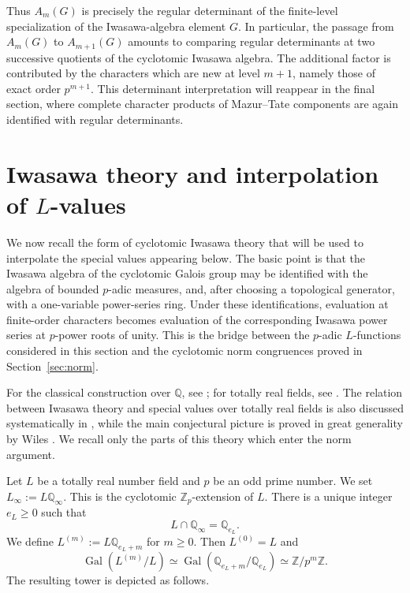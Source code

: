 \documentclass[11pt,table]{amsart}
\numberwithin{equation}{section}
\begin{document}
Thus \(A_m(G)\) is precisely the regular determinant of the finite-level
specialization of the Iwasawa-algebra element \(G\).  In particular, the
passage from \(A_m(G)\) to \(A_{m+1}(G)\) amounts to comparing regular
determinants at two successive quotients of the cyclotomic Iwasawa
algebra.  The additional factor is contributed by the characters which
are new at level \(m+1\), namely those of exact order \(p^{m+1}\).
This determinant interpretation will reappear in the final section, where complete character products of Mazur--Tate components are again identified with regular determinants.
\section{Iwasawa theory and interpolation of $L$-values}\label{s 3}

\par We now recall the form of cyclotomic Iwasawa theory that will be used to
interpolate the special values appearing below.  The basic point is that
the Iwasawa algebra of the cyclotomic Galois group may be identified with
the algebra of bounded $p$-adic measures, and, after choosing a
topological generator, with a one-variable power-series ring.  Under these
identifications, evaluation at finite-order characters becomes evaluation
of the corresponding Iwasawa power series at $p$-power roots of unity.
This is the bridge between the $p$-adic $L$-functions considered in this
section and the cyclotomic norm congruences proved in
Section~\ref{sec:norm}.
\par For the classical construction over $\mathbb Q$, see \cite{KubotaLeopoldt,Iwasawa1972,Washington1997}; for totally real fields, see \cite{CassouNogues,Barsky,DeligneRibet,RibetTotallyReal}.  The relation between Iwasawa theory and special values over totally real fields is also discussed systematically in \cite{CoatesSujatha}, while the main conjectural picture is proved in great generality by Wiles \cite{Wiles1990}.  We recall only the parts of this theory which enter the norm argument.
\par Let $L$ be a totally real number field and \(p\) be an odd prime number. We set $L_\infty:=L\mathbb Q_\infty$. This is the cyclotomic \(\mathbb Z_p\)-extension of \(L\). There is a unique integer
\(e_L\geq0\) such that
\begin{equation}
\label{eq:totally-real-eL}
        L\cap\mathbb Q_\infty
        =
        \mathbb Q_{e_L}.
\end{equation}
We define $L^{(m)}
        :=
        L\mathbb Q_{e_L+m}$ for $m\geq0$.
Then $L^{(0)}=L$ and
\[
        \operatorname{Gal}(L^{(m)}/L)
        \simeq
        \operatorname{Gal}
        (\mathbb Q_{e_L+m}/\mathbb Q_{e_L})
        \simeq
        \mathbb Z/p^m\mathbb Z.
\]
\noindent The resulting tower is depicted as follows.
\end{document}
